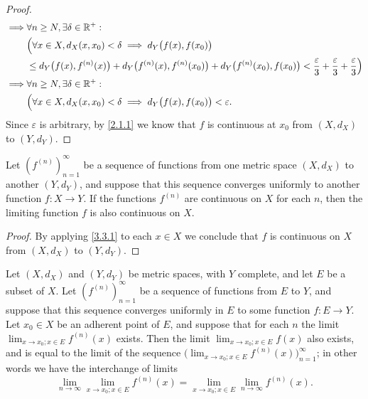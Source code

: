 \begin{proof}
\begin{align*}
    \implies & \forall n \geq N, \exists \delta \in \mathbb{R}^+ :                                                                                                                                                    \\
             & \Big(\forall x \in X, d_X(x, x_0) < \delta \implies d_Y\big(f(x), f(x_0)\big)                                                                                                                  \\
             & \leq d_Y\big(f(x), f^{(n)}(x)\big) + d_Y\big(f^{(n)}(x), f^{(n)}(x_0)\big) + d_Y\big(f^{(n)}(x_0), f(x_0)\big) < \dfrac{\varepsilon}{3} + \dfrac{\varepsilon}{3} + \dfrac{\varepsilon}{3}\Big) \\
    \implies & \forall n \geq N, \exists \delta \in \mathbb{R}^+ :                                                                                                                                                    \\
             & \Big(\forall x \in X, d_X(x, x_0) < \delta \implies d_Y\big(f(x), f(x_0)\big) < \varepsilon.
  \end{align*}
  Since \(\varepsilon\) is arbitrary, by \cref{2.1.1} we know that \(f\) is continuous at \(x_0\) from \((X, d_X)\) to \((Y, d_Y)\).
\end{proof}

\begin{cor}\label{3.3.2}
  Let \((f^{(n)})_{n = 1}^\infty\) be a sequence of functions from one metric space \((X, d_X)\) to another \((Y, d_Y)\), and suppose that this sequence converges uniformly to another function \(f : X \to Y\).
  If the functions \(f^{(n)}\) are continuous on \(X\) for each \(n\), then the limiting function \(f\) is also continuous on \(X\).
\end{cor}

\begin{proof}
  By applying \cref{3.3.1} to each \(x \in X\) we conclude that \(f\) is continuous on \(X\) from \((X, d_X)\) to \((Y, d_Y)\).
\end{proof}

\begin{prop}\label{3.3.3}
  Let
  \((X, d_X)\) and \((Y, d_Y)\) be metric spaces, with \(Y\) complete, and let \(E\) be a subset of \(X\).
  Let \((f^{(n)})_{n = 1}^\infty\) be a sequence of functions from \(E\) to \(Y\), and suppose that this sequence converges uniformly in \(E\) to some function \(f : E \to Y\).
  Let \(x_0 \in X\) be an adherent point of \(E\), and suppose that for each \(n\) the limit \(\lim_{x \to x_0 ; x \in E} f^{(n)}(x)\) exists.
  Then the limit \(\lim_{x \to x_0 ; x \in E} f(x)\) also exists, and is equal to the limit of the sequence \(\big(\lim_{x \to x_0 ; x \in E} f^{(n)}(x)\big)_{n = 1}^\infty\);
  in other words we have the interchange of limits
  \[
    \lim_{n \to \infty} \lim_{x \to x_0 ; x \in E} f^{(n)}(x) = \lim_{x \to x_0 ; x \in E} \lim_{n \to \infty} f^{(n)}(x).
  \]
\end{prop}

